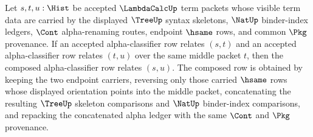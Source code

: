 \begin{theorem}
\label{thm:lambdacalc-alpha-classifier-transitive}
Let $s,t,u:\Hist$ be accepted $\LambdaCalcUp$ term packets whose visible
term data are carried by the displayed $\TreeUp$ syntax skeletons, $\NatUp$
binder-index ledgers, $\Cont$ alpha-renaming routes, endpoint $\hsame$ rows,
and common $\Pkg$ provenance. If an accepted alpha-classifier row relates
$(s,t)$ and an accepted alpha-classifier row relates $(t,u)$ over the same
middle packet $t$, then the composed alpha-classifier row relates $(s,u)$.
The composed row is obtained by keeping the two endpoint carriers, reversing
only those carried $\hsame$ rows whose displayed orientation points into the
middle packet, concatenating the resulting $\TreeUp$ skeleton comparisons and
$\NatUp$ binder-index comparisons, and repacking the concatenated alpha ledger
with the same $\Cont$ and $\Pkg$ provenance.
\end{theorem}
